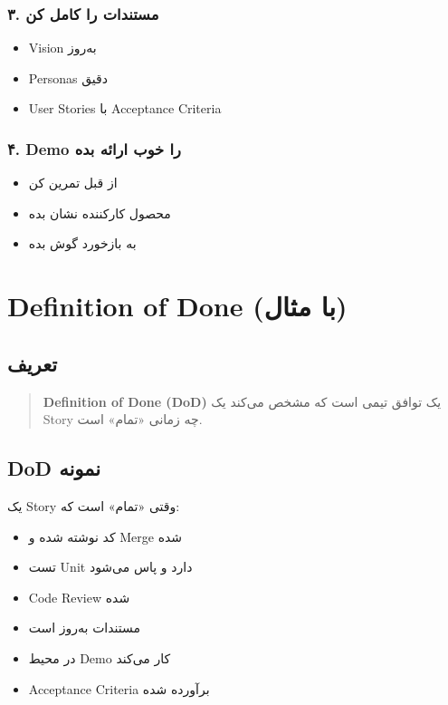 \documentclass[12pt, a4paper]{article}
\begin{document}
\subsubsection{۳. مستندات را کامل کن}
\begin{itemize}
    \item Vision به‌روز
    \item Personas دقیق
    \item User Stories با Acceptance Criteria
\end{itemize}

\subsubsection{۴. Demo را خوب ارائه بده}
\begin{itemize}
    \item از قبل تمرین کن
    \item محصول کارکننده نشان بده
    \item به بازخورد گوش بده
\end{itemize}

\section{Definition of Done (با مثال)}

\subsection{تعریف}
\begin{quote}
\textbf{Definition of Done (DoD)} یک توافق تیمی است که مشخص می‌کند یک Story 
چه زمانی «تمام» است.
\end{quote}

\subsection{DoD نمونه}

یک Story وقتی «تمام» است که:
\begin{itemize}
    \item[$\square$] کد نوشته شده و Merge شده
    \item[$\square$] تست Unit دارد و پاس می‌شود
    \item[$\square$] Code Review شده
    \item[$\square$] مستندات به‌روز است
    \item[$\square$] در محیط Demo کار می‌کند
    \item[$\square$] Acceptance Criteria برآورده شده
\end{itemize}
\end{document}
